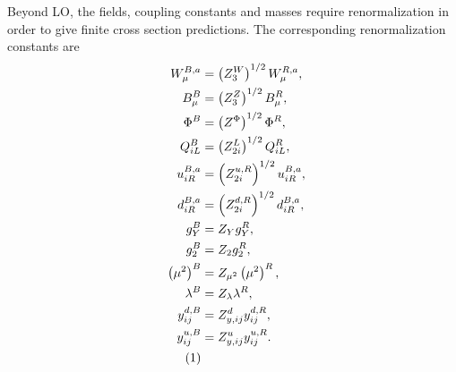 Beyond \acs{LO}, the fields, coupling constants and masses require renormalization in order to give finite cross section predictions. The corresponding renormalization constants are
\begin{align*}
  W_\mu^{B,a} &= \left(Z_3^W \right)^{1/2} W_\mu^{R,a}, \\
  B_\mu^{B} &= \left(Z_3^Z \right)^{1/2} B_\mu^{R}, \\
  \Phi^{B} &= \left(Z^\Phi \right)^{1/2} \Phi^{R}, \\
  Q_{iL}^{B} &= \left(Z_{2i}^L \right)^{1/2} Q_{iL}^{R}, \\
  u_{iR}^{B,a} &= \left(Z_{2i}^{u,R} \right)^{1/2} u_{iR}^{B,a}, \\
  d_{iR}^{B,a} &= \left(Z_{2i}^{d,R} \right)^{1/2} d_{iR}^{B,a}, \\
  g_Y^B &= Z_Y g_Y^R ,\\
  g_2^B &= Z_2 g_2^R ,\\
  \left(\mu^2 \right)^B &= Z_{\mu^2} \left( \mu^2 \right)^R, \\
  \lambda^B &= Z_\lambda \lambda^R ,\\
  y_{ij}^{d,B} &= Z_{y,ij}^{d} y_{ij}^{d,R}, \\
  y_{ij}^{u,B} &= Z_{y,ij}^{u} y_{ij}^{u,R}. \\
  \refstepcounter{equation}
  \tag{\theequation} \label{eq:2:renormalization}
\end{align*}

